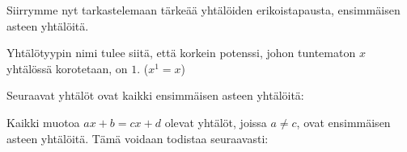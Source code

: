 Siirrymme nyt tarkastelemaan tärkeää yhtälöiden erikoistapausta, ensimmäisen asteen yhtälöitä.


Yhtälötyypin nimi tulee siitä, että korkein potenssi, johon tuntematon $x$ yhtälössä korotetaan, on $1$. ($x^1=x$)

\begin{esimerkki}
Seuraavat yhtälöt ovat kaikki ensimmäisen asteen yhtälöitä:
\end{esimerkki}


%		

Kaikki muotoa $ax+b=cx+d$ olevat yhtälöt, joissa $a \neq c$, ovat ensimmäisen asteen yhtälöitä. Tämä voidaan todistaa seuraavasti:

